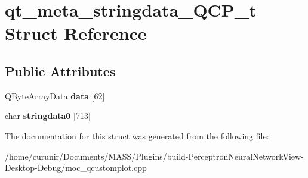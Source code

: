 \hypertarget{structqt__meta__stringdata___q_c_p__t}{}\section{qt\+\_\+meta\+\_\+stringdata\+\_\+\+Q\+C\+P\+\_\+t Struct Reference}
\label{structqt__meta__stringdata___q_c_p__t}
\subsection*{Public Attributes}
\begin{DoxyCompactItemize}
\item 
Q\+Byte\+Array\+Data {\bfseries data} \mbox{[}62\mbox{]}\hypertarget{structqt__meta__stringdata___q_c_p__t_abc9c399ac75b9d32e347271273ccd5b6}{}\label{structqt__meta__stringdata___q_c_p__t_abc9c399ac75b9d32e347271273ccd5b6}

\item 
char {\bfseries stringdata0} \mbox{[}713\mbox{]}\hypertarget{structqt__meta__stringdata___q_c_p__t_a884365a57221bf71e4c60c1e2a9fc5f2}{}\label{structqt__meta__stringdata___q_c_p__t_a884365a57221bf71e4c60c1e2a9fc5f2}

\end{DoxyCompactItemize}


The documentation for this struct was generated from the following file\+:\begin{DoxyCompactItemize}
\item 
/home/curunir/\+Documents/\+M\+A\+S\+S/\+Plugins/build-\/\+Perceptron\+Neural\+Network\+View-\/\+Desktop-\/\+Debug/moc\+\_\+qcustomplot.\+cpp\end{DoxyCompactItemize}
